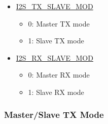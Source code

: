 \documentclass[main\_\_EN.tex]{subfiles}
\begin{document}
\begin{itemize}
    \item \hyperref[fielddesc:I2STXSLAVEMOD]{I2S\_TX\_SLAVE\_MOD} 
    \begin{itemize}
        \item 0: Master TX mode
        \item 1: Slave TX mode
    \end{itemize}
    \item \hyperref[fielddesc:I2SRXSLAVEMOD]{I2S\_RX\_SLAVE\_MOD}
    \begin{itemize}
        \item 0: Master RX mode
        \item 1: Slave RX mode
    \end{itemize}
\end{itemize}

\subsubsection{Master/Slave TX Mode} \label{sec:i2s-master-slave-tx-mode}
\end{document}
